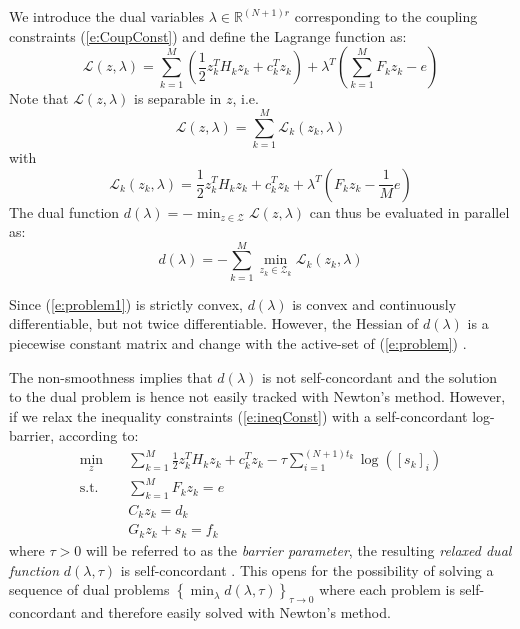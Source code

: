 We introduce the dual variables $\lambda \in \mathbb{R}^{(N+1) r}$ corresponding to the coupling constraints (\ref{e:CoupConst}) and define the Lagrange function as:
\begin{equation}
\mathcal{L}(z,\lambda) =  \sum_{k=1}^{M} ( \frac{1}{2}z_k^TH_kz_k + c_k^Tz_k ) + \lambda^T ( \sum_{k=1}^{M} F_k z_k - e )
\end{equation}
Note that $\mathcal{L}(z,\lambda)$ is separable in $z$, i.e.
\begin{equation}
\mathcal{L}(z,\lambda) = \sum_{k=1}^{M} \mathcal{L}_k (z_k,\lambda)
\end{equation}
with
\begin{equation}
\mathcal{L}_k(z_k,\lambda) = \frac{1}{2}z_k^TH_k z_k + c_k^T z_k + \lambda^T(F_k z_k - \frac{1}{M} e)
\end{equation}
The dual function $d(\lambda) = -\min_{z \in \mathcal{Z}} \mathcal{L}(z,\lambda)$ can thus be evaluated in parallel as:
\begin{equation}
\label{e:dualfunction}
d(\lambda) = -\sum_{k=1}^M \min_{z_k \in \mathcal{Z}_k} \mathcal{L}_k(z_k,\lambda)
\end{equation}

Since (\ref{e:problem1}) is strictly convex, $d(\lambda)$ is convex and continuously differentiable, but not twice differentiable. However, the Hessian of $d(\lambda)$ is a piecewise constant matrix and change with the active-set of (\ref{e:problem}) \cite{Kozma2014a}.

The non-smoothness implies that $d(\lambda)$ is not self-concordant and the solution to the dual problem is hence not easily tracked with Newton's method. However, if we relax the inequality constraints (\ref{e:ineqConst}) with a self-concordant log-barrier, according to:
\begin{subequations}
\label{e:relaxedproblem}
\begin{align}
\min_z & \quad \sum_{k=1}^{M} \frac{1}{2}z_k^TH_k z_k + c_k^T z_k - \tau \sum_{i=1}^{(N+1)t_k} \log([s_k]_i) \label{e:1} \\
\text{s.t.} & \quad \sum_{k=1}^{M} F_k z_k = e \\
& \quad C_k z_k = d_k \\
& \quad G_k z_k + s_k = f_k
\end{align}
\end{subequations}
where $\tau > 0$ will be referred to as the \emph{barrier parameter}, the resulting \emph{relaxed dual function} $d(\lambda, \tau)$ is self-concordant \cite{Necoara2009a}. This opens for the possibility of solving a sequence of dual problems $\left\{\min_\lambda d(\lambda, \tau) \right\}_{\tau \rightarrow 0}$ where each problem is self-concordant and therefore easily solved with Newton's method.

